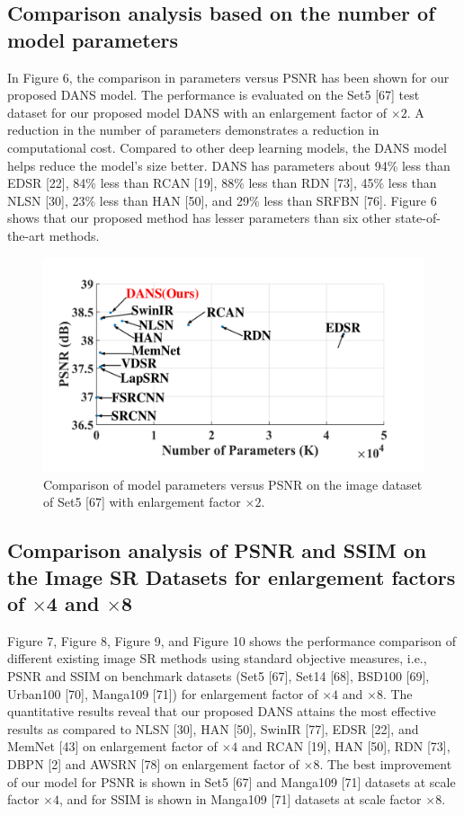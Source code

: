 \documentclass{ieeeaccess}
\begin{document}
\subsection{Comparison analysis based on the number of model parameters}
In Figure 6, the comparison in parameters versus PSNR has been shown for our proposed DANS model. The performance is evaluated on the Set5 [67] test dataset for our proposed model DANS with an enlargement factor of $\times 2$. A reduction in the number of parameters demonstrates a reduction in computational cost. Compared to other deep learning models, the DANS model helps reduce the model's size better. DANS has parameters about 94\% less than EDSR [22], 84\% less than RCAN [19], 88\% less than RDN [73], 45\% less than NLSN [30], 23\% less than HAN [50], and 29\% less than SRFBN [76]. Figure 6 shows that our proposed method has lesser parameters than six other state-of-the-art methods.

\begin{figure}[ht]
  \includegraphics[width=\linewidth]{6FIGURE.pdf}
  \caption{Comparison of model parameters versus PSNR on the image dataset of Set5 [67] with enlargement factor $\times2$.}
  \label{fig:6}
\end{figure}

\subsection{Comparison analysis of PSNR and SSIM on the Image SR Datasets for enlargement factors of $\times$4 and $\times$8}

Figure	 7, Figure 8, Figure 9, and Figure 10 shows the performance comparison of different existing image SR methods using standard objective measures, i.e., PSNR and SSIM on benchmark datasets (Set5 [67], Set14 [68], BSD100 [69], Urban100 [70], Manga109 [71]) for enlargement factor of $\times4$ and $\times8$. The quantitative results reveal that our proposed DANS attains the most effective results as compared to NLSN [30], HAN [50], SwinIR [77], EDSR [22], and MemNet [43] on enlargement factor of $\times4$ and RCAN [19], HAN [50], RDN [73], DBPN [2] and AWSRN [78] on enlargement factor of $\times8$. The best improvement of our model for PSNR is shown in Set5 [67] and Manga109 [71] datasets at scale factor $\times4$, and for SSIM is shown in Manga109 [71] datasets at scale factor $\times8$.
\end{document}
